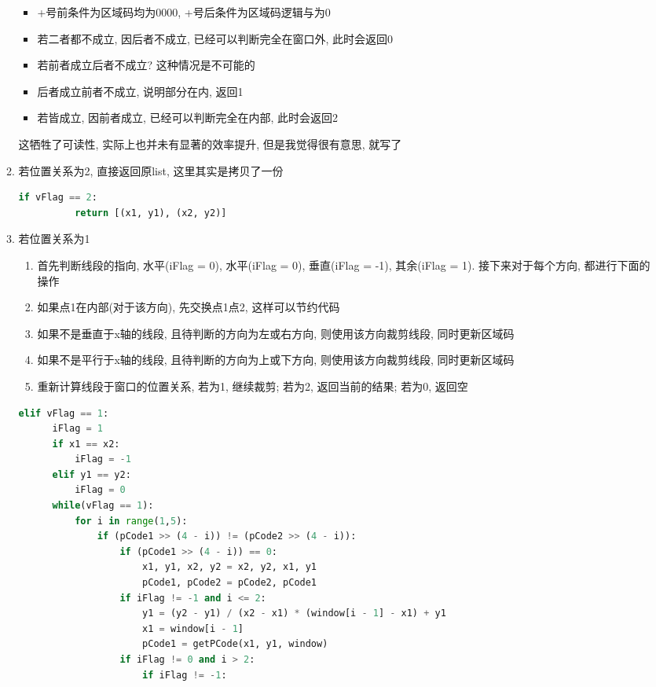 \documentclass[a4paper,UTF8]{article}
\theoremstyle{definition}
\begin{document}
\begin{itemize}
\begin{enumerate}
\begin{itemize}
      \item +号前条件为区域码均为0000, +号后条件为区域码逻辑与为0
      \item 若二者都不成立, 因后者不成立, 已经可以判断完全在窗口外, 此时会返回0
      \item 若前者成立后者不成立? 这种情况是不可能的
      \item 后者成立前者不成立, 说明部分在内, 返回1
      \item 若皆成立, 因前者成立, 已经可以判断完全在内部, 此时会返回2
    \end{itemize}
    这牺牲了可读性, 实际上也并未有显著的效率提升, 但是我觉得很有意思, 就写了
    \item 若位置关系为2, 直接返回原list, 这里其实是拷贝了一份
    \begin{lstlisting}[language={Python}] 
      if vFlag == 2: 
          return [(x1, y1), (x2, y2)]
    \end{lstlisting}
    \item 若位置关系为1\begin{enumerate}
      \item 首先判断线段的指向, 水平(iFlag = 0), 水平(iFlag = 0), 垂直(iFlag = -1), 其余(iFlag = 1). 接下来对于每个方向, 都进行下面的操作
      \item 如果点1在内部(对于该方向), 先交换点1点2, 这样可以节约代码
      \item 如果不是垂直于x轴的线段, 且待判断的方向为左或右方向, 则使用该方向裁剪线段, 同时更新区域码
      \item 如果不是平行于x轴的线段, 且待判断的方向为上或下方向, 则使用该方向裁剪线段, 同时更新区域码
      \item 重新计算线段于窗口的位置关系, 若为1, 继续裁剪; 若为2, 返回当前的结果; 若为0, 返回空
    \end{enumerate}
    \begin{lstlisting}[language={Python}] 
  elif vFlag == 1:
      iFlag = 1
      if x1 == x2:
          iFlag = -1
      elif y1 == y2:
          iFlag = 0
      while(vFlag == 1):
          for i in range(1,5):
              if (pCode1 >> (4 - i)) != (pCode2 >> (4 - i)):
                  if (pCode1 >> (4 - i)) == 0:
                      x1, y1, x2, y2 = x2, y2, x1, y1
                      pCode1, pCode2 = pCode2, pCode1
                  if iFlag != -1 and i <= 2:
                      y1 = (y2 - y1) / (x2 - x1) * (window[i - 1] - x1) + y1
                      x1 = window[i - 1]
                      pCode1 = getPCode(x1, y1, window)
                  if iFlag != 0 and i > 2:
                      if iFlag != -1:

\end{lstlisting}
\end{enumerate}
\end{itemize}
\end{document}
